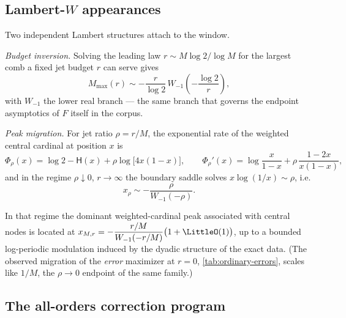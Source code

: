 \documentclass[11pt,oneside]{article}
\numberwithin{equation}{section}
\theoremstyle{definition}
\theoremstyle{remark}
\newcommand{\Hyp}{\mathsf H}
\begin{document}
\subsection{Lambert-$W$ appearances}

Two independent Lambert structures attach to the window.

\emph{Budget inversion.}  Solving the leading law
$r\sim M\log2/\log M$ for the largest comb a fixed jet budget $r$ can
serve gives
\begin{equation}
 M_{\max}(r)\sim-\frac{r}{\log2}\,
 W_{-1}\!\left(-\frac{\log2}{r}\right),
 \label{eq:lambert-budget}
\end{equation}
with $W_{-1}$ the lower real branch --- the same branch that governs
the endpoint asymptotics of $F$ itself in the corpus.

\emph{Peak migration.}  For jet ratio $\rho=r/M$, the exponential
rate of the weighted central cardinal at position $x$ is
\begin{equation}
 \Phi_\rho(x)=\log2-\Hyp(x)+\rho\log\bigl[4x(1-x)\bigr],
 \qquad
 \Phi_\rho'(x)=\log\frac{x}{1-x}+\rho\,\frac{1-2x}{x(1-x)},
 \label{eq:rate-function}
\end{equation}
and in the regime $\rho\downarrow0$, $r\to\infty$ the boundary saddle
solves $x\log(1/x)\sim\rho$, i.e.
\begin{equation}
 x_\rho\sim-\frac{\rho}{W_{-1}(-\rho)}.
 \label{eq:lambert-peak}
\end{equation}

\begin{conjecture}
\label{conj:lambert-peak}
In that regime the dominant weighted-cardinal peak associated with
central nodes is located at
$x_{M,r}=-\dfrac{r/M}{W_{-1}(-r/M)}\bigl(1+\LittleO(1)\bigr)$, up to a
bounded log-periodic modulation induced by the dyadic structure of the
exact data.  (The observed migration of the \emph{error} maximizer at
$r=0$, \cref{tab:ordinary-errors}, scales like $1/M$, the
$\rho\to0$ endpoint of the same family.)
\end{conjecture}

\subsection{The all-orders correction program}
\end{document}
